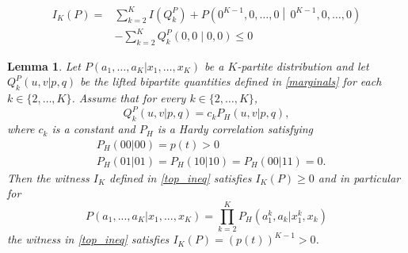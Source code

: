 \documentclass[10pt,a4paper]{amsart}
\newtheorem{lem}{Lemma}
\begin{document}
\begin{align}\nonumber
I_K(P)
=&
\sum_{k=2}^{K} I(Q^P_k)
+
P\left(0^{K-1},0,\ldots,0 \middle|\, 0^{K-1},0,\ldots,0\right)
\\& \label{top_ineq} -
\sum_{k=2}^{K} Q^P_k(0,0\mid 0,0)\leq 0 
\end{align}

\begin{lem}\label{lem_B2}Let $P(a_1,\ldots,a_K|x_1,\ldots,x_K)$ be a $K$-partite distribution and let $Q_k^P(u,v|p,q)$ be the lifted bipartite quantities defined in \eqref{marginals} for each $k\in\{2,\ldots,K\}$. Assume that for every $k\in\{2,\ldots,K\}$,
\[
Q_k^P(u,v|p,q)=c_k P_H(u,v|p,q),
\]
where $c_k$ is a constant and $P_H$ is a Hardy correlation satisfying
\begin{align}\nonumber
&P_H(00|00)=p(t)>0\\&P_H(01|01)=P_H(10|10)=P_H(00|11)=0. \label{eq:hardy}
\end{align}
Then the witness $I_K$ defined in \eqref{top_ineq} satisfies $I_K(P)\ge0$ and in particular for 
\begin{equation}\label{this_dist}  P(a_1,...,a_K|x_1,...,x_K)=\prod_{k=2}^KP_H(a_1^k,a_k|x_1^k,x_k)
\end{equation}
the witness in \eqref{top_ineq} satisfies $I_K(P)=(p(t))^{K-1}>0$.
\end{lem}
\end{document}
